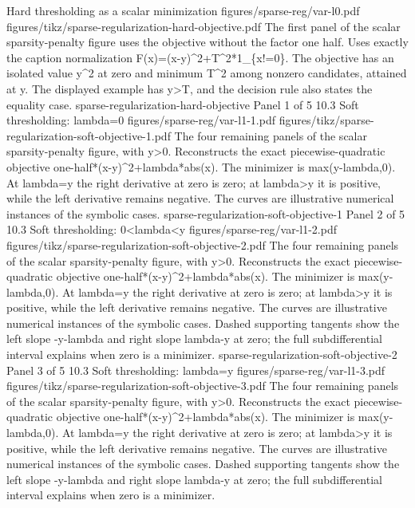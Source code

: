 {Hard thresholding as a scalar minimization}
{figures/sparse-reg/var-l0.pdf}
{figures/tikz/sparse-regularization-hard-objective.pdf}
{The first panel of the scalar sparsity-penalty figure uses the objective without the factor one half.}
{Uses exactly the caption normalization F(x)=(x-y)\textasciicircum{}2+T\textasciicircum{}2*1\_\{x!=0\}. The objective has an isolated value y\textasciicircum{}2 at zero and minimum T\textasciicircum{}2 among nonzero candidates, attained at y. The displayed example has y>T, and the decision rule also states the equality case.}
{sparse-regularization-hard-objective}
{Panel 1 of 5}
{10.3}
{Soft thresholding: lambda=0}
{figures/sparse-reg/var-l1-1.pdf}
{figures/tikz/sparse-regularization-soft-objective-1.pdf}
{The four remaining panels of the scalar sparsity-penalty figure, with y>0.}
{Reconstructs the exact piecewise-quadratic objective one-half*(x-y)\textasciicircum{}2+lambda*abs(x). The minimizer is max(y-lambda,0). At lambda=y the right derivative at zero is zero; at lambda>y it is positive, while the left derivative remains negative. The curves are illustrative numerical instances of the symbolic cases.}
{sparse-regularization-soft-objective-1}
{Panel 2 of 5}
{10.3}
{Soft thresholding: 0<lambda<y}
{figures/sparse-reg/var-l1-2.pdf}
{figures/tikz/sparse-regularization-soft-objective-2.pdf}
{The four remaining panels of the scalar sparsity-penalty figure, with y>0.}
{Reconstructs the exact piecewise-quadratic objective one-half*(x-y)\textasciicircum{}2+lambda*abs(x). The minimizer is max(y-lambda,0). At lambda=y the right derivative at zero is zero; at lambda>y it is positive, while the left derivative remains negative. The curves are illustrative numerical instances of the symbolic cases. Dashed supporting tangents show the left slope -y-lambda and right slope lambda-y at zero; the full subdifferential interval explains when zero is a minimizer.}
{sparse-regularization-soft-objective-2}
{Panel 3 of 5}
{10.3}
{Soft thresholding: lambda=y}
{figures/sparse-reg/var-l1-3.pdf}
{figures/tikz/sparse-regularization-soft-objective-3.pdf}
{The four remaining panels of the scalar sparsity-penalty figure, with y>0.}
{Reconstructs the exact piecewise-quadratic objective one-half*(x-y)\textasciicircum{}2+lambda*abs(x). The minimizer is max(y-lambda,0). At lambda=y the right derivative at zero is zero; at lambda>y it is positive, while the left derivative remains negative. The curves are illustrative numerical instances of the symbolic cases. Dashed supporting tangents show the left slope -y-lambda and right slope lambda-y at zero; the full subdifferential interval explains when zero is a minimizer.}
